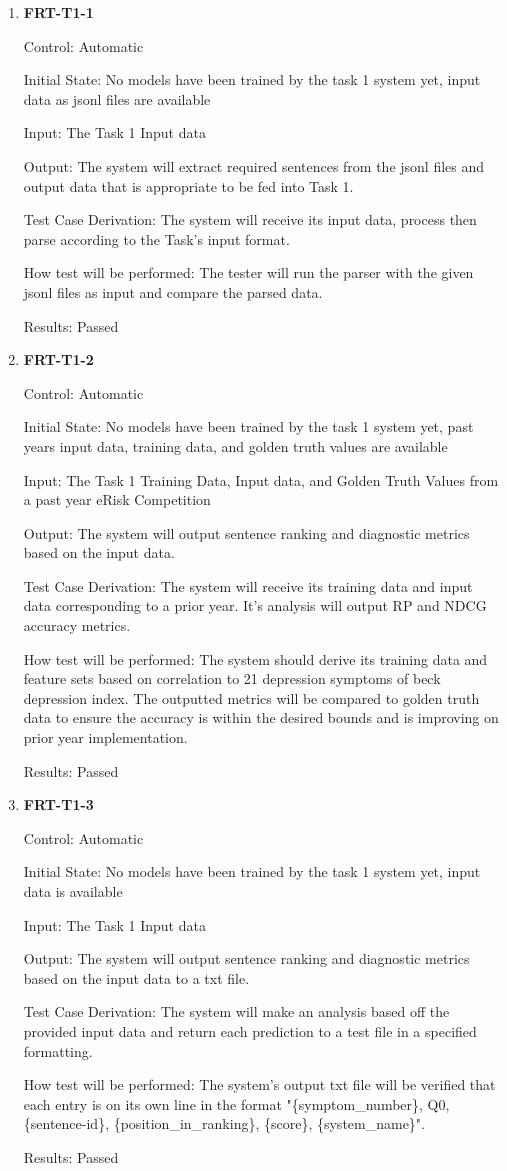 \documentclass[12pt, titlepage]{article}
\begin{document}
\begin{enumerate}
\item \textbf{FRT-T1-1}

Control: Automatic

Initial State: No models have been trained by the task 1 system yet, input data as jsonl files are available

Input: The Task 1 Input data

Output: The system will extract required sentences from the jsonl files and output data that is appropriate to be fed into Task 1.

Test Case Derivation: The system will receive its input data, process then parse according to the Task's input format.

How test will be performed: The tester will run the parser with the given jsonl files as input and compare the parsed data.

Results: Passed

\item \textbf{FRT-T1-2}

Control: Automatic

Initial State: No models have been trained by the task 1 system yet, past years input data, training data, and golden truth values are available

Input: The Task 1 Training Data, Input data, and Golden Truth Values from a past year eRisk Competition

Output: The system will output sentence ranking and diagnostic metrics based on the input data. 

Test Case Derivation: The system will receive its training data and input data corresponding to a prior year. It's analysis will output RP and NDCG accuracy metrics.

How test will be performed: The system should derive its training data and feature sets based on correlation to 21 depression symptoms of beck depression index. The outputted metrics will be compared to golden truth data to ensure the accuracy is within the desired bounds and is improving on prior year implementation.

Results: Passed

\item \textbf{FRT-T1-3}

Control: Automatic

Initial State: No models have been trained by the task 1 system yet, input data is available

Input: The Task 1 Input data

Output: The system will output sentence ranking and diagnostic metrics based on the input data to a txt file.

Test Case Derivation: The system will make an analysis based off the provided input data and return each prediction to a test file in a specified formatting.

How test will be performed: The system's output txt file will be verified that each entry is on its own line in the format "\{symptom\_number\}, Q0, \{sentence-id\}, \{position\_in\_ranking\}, \{score\}, \{system\_name\}".

Results: Passed

\end{enumerate}
\end{document}
